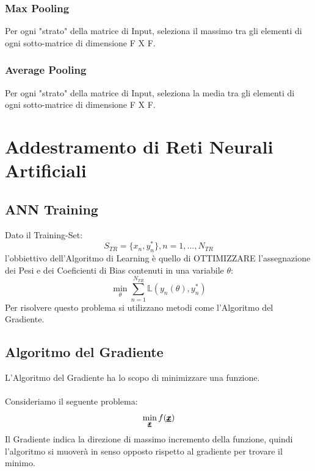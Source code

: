 \subsubsection{Max Pooling}
Per ogni "strato" della matrice di Input, seleziona il massimo tra gli elementi di ogni sotto-matrice di dimensione F X F.

\subsubsection{Average Pooling}
Per ogni "strato" della matrice di Input, seleziona la media tra gli elementi di ogni sotto-matrice di dimensione F X F.



\section{Addestramento di Reti Neurali Artificiali}
\subsection{ANN Training}
Dato il Training-Set:
\begin{equation*}
    S_{TR} = \{x_n, y_n^*\}, n=1,...,N_{TR}
\end{equation*}
l'obbiettivo dell'Algoritmo di Learning è quello di OTTIMIZZARE l'assegnazione dei Pesi e dei Coeficienti di Bias contenuti in una variabile $\theta$:
\begin{equation*}
    \min_\theta \sum_{n=1}^{N_{TR}} \mathbb{L}(y_n(\theta), y_n^*)
\end{equation*}
Per risolvere questo problema si utilizzano metodi come l'Algoritmo del Gradiente.

\subsection{Algoritmo del Gradiente}
L'Algoritmo del Gradiente ha lo scopo di minimizzare una funzione.\\ \\
Consideriamo il seguente problema:
\begin{equation*}
    \min_{\pmb{\underline{x}}} f(\pmb{\underline{x}})
\end{equation*}
Il Gradiente indica la direzione di massimo incremento della funzione, quindi l'algoritmo si muoverà in senso opposto rispetto al gradiente per trovare il minimo.



